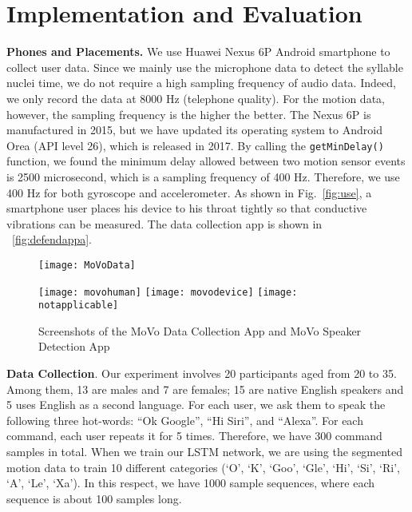 \section{Implementation and Evaluation}


\textbf{Phones and Placements.} We use Huawei Nexus 6P Android smartphone to collect user data. Since we mainly use the microphone data to detect the syllable nuclei time, we do not require a high sampling frequency of audio data. Indeed, we only record the data at 8000 Hz (telephone quality). For the motion data, however, the sampling frequency is the higher the better. The Nexus 6P is manufactured in 2015, but we have updated its operating system to Android Orea (API level 26), which is released in 2017. By calling the \texttt{getMinDelay()} function, we found the minimum delay allowed between two motion sensor events is 2500 microsecond, which is a sampling frequency of 400 Hz. Therefore, we use 400 Hz for both gyroscope and accelerometer. As shown in Fig.~\ref{fig:use}, a smartphone user places his device to his throat tightly so that conductive vibrations can be measured. The data collection app is shown in ~\ref{fig:defendappa}.

\begin{figure}[H]
	\centering
	\begin{minipage}{.3\linewidth}
		\texttt{[image: MoVoData]}
		\label{fig:defendappa}
	\end{minipage}
	\qquad 
	\begin{minipage}{.6\linewidth}
		\texttt{[image: movohuman]}
		\vspace{.1in}
		\texttt{[image: movodevice]}
		\vspace{.1in}
		\texttt{[image: notapplicable]}
	\end{minipage}
	\caption{Screenshots of the MoVo Data Collection App and MoVo Speaker Detection App}	
	\label{fig:defendapp}
\end{figure}

\textbf{Data Collection}. Our experiment involves 20 participants aged from 20 to 35. Among them, 13 are males and 7 are females; 15 are native English speakers and 5 uses English as a second language. For each user, we ask them to speak the following three hot-words: ``Ok Google'', ``Hi Siri'', and ``Alexa''. For each command, each user repeats it for 5 times. Therefore, we have 300 command samples in total. When we train our LSTM network, we are using the segmented motion data to train 10 different categories (`O', `K', `Goo', `Gle', `Hi', `Si', `Ri', `A', `Le', `Xa'). In this respect, we have 1000 sample sequences, where each sequence is about 100 samples long.


